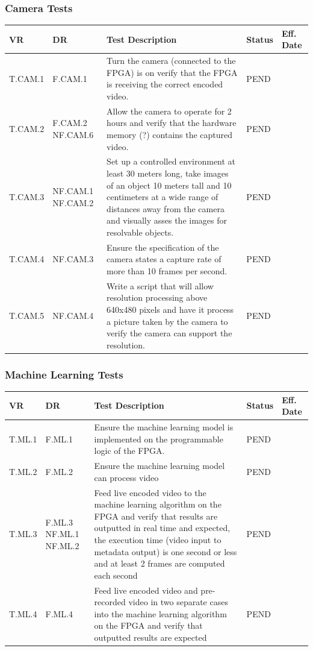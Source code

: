 \documentclass[10pt,letterpaper]{article}
\begin{document}
\subsubsection{Camera Tests}
\begin{table}[H]
	\begin{tabular}{ |p{1.2cm}|p{1.4cm}|p{9cm}|p{1.1cm}|p{1.7cm}|}
		\hline
		\textbf{VR}     & \textbf{DR}      & \textbf{Test Description}  	& \textbf{Status} & \textbf{Eff. Date} \\ \hline
		T.CAM.1 & F.CAM.1 	& Turn the camera (connected to the FPGA) is on verify that the FPGA is receiving the correct encoded video. & PEND & \\ \hline
		T.CAM.2 & F.CAM.2 NF.CAM.6 	& Allow the camera to operate for 2 hours and verify that the hardware memory (?) contains the captured video. & PEND & \\ \hline
		T.CAM.3 & NF.CAM.1 NF.CAM.2	& Set up a controlled environment at least 30 meters long, take images of an object 10 meters tall and 10 centimeters at a wide range of distances away from the camera and visually asses the images for resolvable objects. & PEND & \\ \hline
		T.CAM.4 & NF.CAM.3	& Ensure the specification of the camera states a capture rate of more than 10 frames per second. & PEND & \\ \hline %
		T.CAM.5 & NF.CAM.4	& Write a script that will allow resolution processing above 640x480 pixels and have it process a picture taken by the camera to verify the camera can support the resolution. & PEND & \\ \hline
	\end{tabular}
\end{table}
\subsubsection{Machine Learning Tests}
\begin{table}[H]
	\begin{tabular}{ |p{1.1cm}|p{1.3cm}|p{9cm}|p{1.1cm}|p{1.7cm}|}
		\hline
		\textbf{VR}     & \textbf{DR}      & \textbf{Test Description}  	& \textbf{Status} & \textbf{Eff. Date} \\ \hline
		T.ML.1 & F.ML.1		& Ensure the machine learning model is implemented on the programmable logic of the FPGA. & PEND & \\ \hline %
		T.ML.2 & F.ML.2		& Ensure the machine learning model can process video & PEND & \\ \hline %
		T.ML.3 & F.ML.3 NF.ML.1 NF.ML.2	& Feed live encoded video to the machine learning algorithm on the FPGA and verify that results are outputted in real time and expected, the execution time (video input to metadata output) is one second or less and at least 2 frames are computed each second & PEND & \\ \hline
		T.ML.4 & F.ML.4		& Feed live encoded video and pre-recorded video in two separate cases into the machine learning algorithm on the FPGA and verify that outputted results are expected & PEND & \\ \hline
	\end{tabular}
\end{table}
\end{document}
